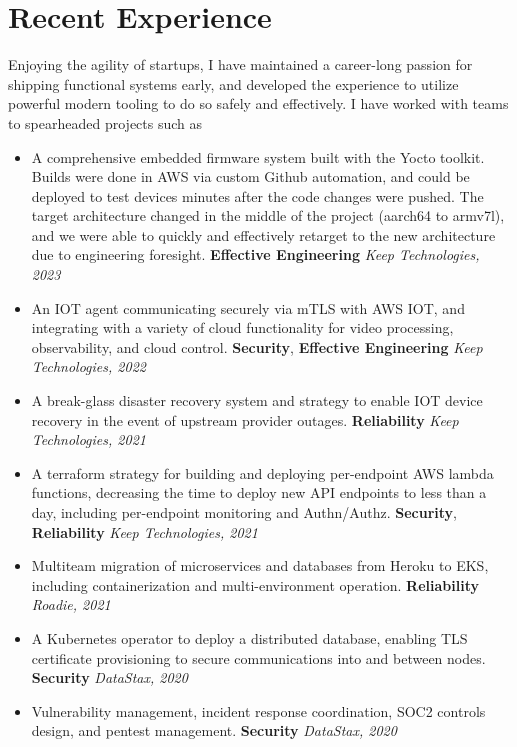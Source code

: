 \documentclass[letterpaper,10pt]{article}
\begin{document}
\section{Recent Experience}
Enjoying the agility of startups, I have maintained a
career-long passion for shipping functional systems early, and developed the experience to
utilize powerful modern tooling to do so safely and effectively. I have
worked with teams to spearheaded projects such as
\begin{itemize}
	\setlength\itemsep{0.1em} \item A comprehensive embedded firmware system
	built with the Yocto toolkit. Builds were done in AWS via custom Github
	automation, and could be deployed to test devices minutes after the code
	changes were pushed. The target architecture
	      changed in the middle of the project (aarch64 to armv7l), and we were able to quickly and effectively retarget to the new architecture due to engineering foresight. \textbf{Effective Engineering} \textit{Keep Technologies, 2023}
	\item An IOT agent communicating securely via mTLS with AWS IOT, and integrating with a variety of cloud functionality for video processing, observability, and cloud control. \textbf{Security}, \textbf{Effective Engineering} \textit{Keep Technologies, 2022}
	\item A break-glass disaster recovery system and strategy to enable IOT device recovery in the event of upstream provider outages. \textbf{Reliability} \textit{Keep Technologies, 2021}
	\item A terraform strategy for building and deploying per-endpoint AWS lambda functions, decreasing the time to deploy new API endpoints to less than a day, including per-endpoint monitoring and Authn/Authz. \textbf{Security}, \textbf{Reliability} \textit{Keep Technologies, 2021}
	\item Multiteam migration of microservices and databases from Heroku to EKS, including containerization and multi-environment operation. \textbf{Reliability} \textit{Roadie, 2021}
	\item A Kubernetes operator to deploy a distributed database, enabling TLS certificate provisioning to secure communications into and between nodes. \textbf{Security} \textit{DataStax, 2020}
	\item Vulnerability management, incident response coordination, SOC2 controls design, and pentest management. \textbf{Security} \textit{DataStax, 2020}
\end{itemize}
\end{document}
